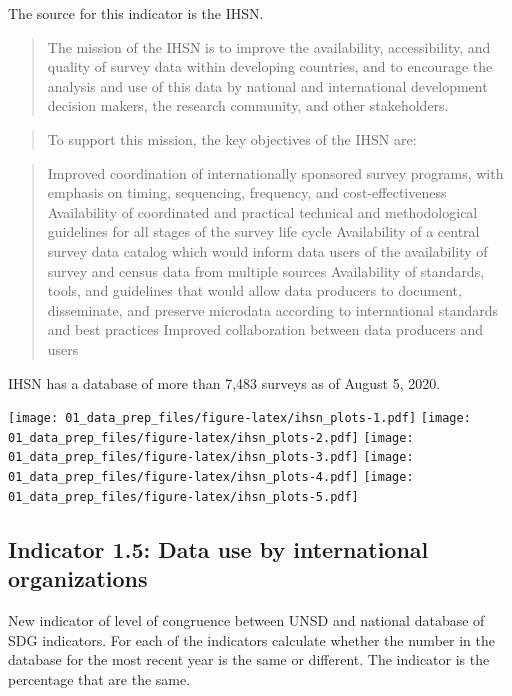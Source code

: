 \documentclass[]{article}
\begin{document}
The source for this indicator is the IHSN.

\begin{quote}
The mission of the IHSN is to improve the availability, accessibility,
and quality of survey data within developing countries, and to encourage
the analysis and use of this data by national and international
development decision makers, the research community, and other
stakeholders.
\end{quote}

\begin{quote}
To support this mission, the key objectives of the IHSN are:
\end{quote}

\begin{quote}
Improved coordination of internationally sponsored survey programs, with
emphasis on timing, sequencing, frequency, and cost-effectiveness
Availability of coordinated and practical technical and methodological
guidelines for all stages of the survey life cycle Availability of a
central survey data catalog which would inform data users of the
availability of survey and census data from multiple sources
Availability of standards, tools, and guidelines that would allow data
producers to document, disseminate, and preserve microdata according to
international standards and best practices Improved collaboration
between data producers and users
\end{quote}

IHSN has a database of more than 7,483 surveys as of August 5, 2020.

\texttt{[image: 01\_data\_prep\_files/figure-latex/ihsn\_plots-1.pdf]}
\texttt{[image: 01\_data\_prep\_files/figure-latex/ihsn\_plots-2.pdf]}
\texttt{[image: 01\_data\_prep\_files/figure-latex/ihsn\_plots-3.pdf]}
\texttt{[image: 01\_data\_prep\_files/figure-latex/ihsn\_plots-4.pdf]}
\texttt{[image: 01\_data\_prep\_files/figure-latex/ihsn\_plots-5.pdf]}

\hypertarget{indicator-1.5-data-use-by-international-organizations}{%
\subsection{Indicator 1.5: Data use by international
organizations}\label{indicator-1.5-data-use-by-international-organizations}}

New indicator of level of congruence between UNSD and national database
of SDG indicators. For each of the indicators calculate whether the
number in the database for the most recent year is the same or
different. The indicator is the percentage that are the same.
\end{document}
